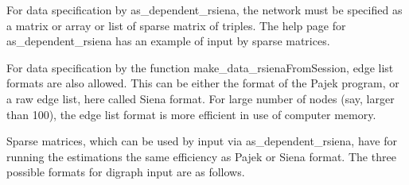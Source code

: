 \documentclass[a4paper,fleqn,11pt]{article}
\newcommand{\+}{\, + \,}
\newcommand{\sfn}[1]{\textsf{#1}}
\newcommand{\sn}{{\sf StOCNET}}
\begin{document}
For data specification by  \textsf{as\_dependent\_rsiena}, the network
must be specified as a matrix or array or list of sparse matrix of triples.
The help page for \textsf{as\_dependent\_rsiena} has an example of input
by sparse matrices.

For data specification by
the function \textsf{make\_data\_rsienaFromSession},
edge list formats are also allowed. This can be either the
format of the Pajek program, or a raw edge list, here called Siena format.
For large number of nodes (say, larger than 100), the edge list
format is more efficient in use of computer memory.


Sparse matrices, which can be used by input via
\sfn{as\_dependent\_rsiena}, have for running the estimations
the same efficiency as Pajek or Siena format.
The three possible formats for digraph input are as follows.
\end{document}
